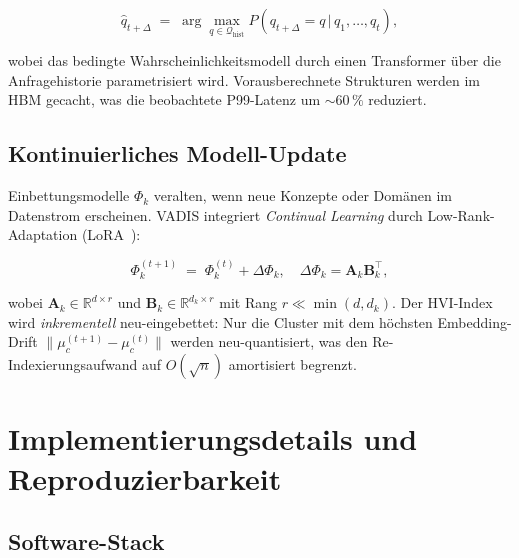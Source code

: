 ﻿\documentclass[12pt,a4paper]{article}
\begin{document}
\begin{equation}
  \hat{q}_{t+\Delta} \;=\; \arg\max_{q \in \mathcal{Q}_{\text{hist}}}
  P\!\left(q_{t+\Delta} = q \,|\, q_1, \ldots, q_t\right),
\end{equation}

wobei das bedingte Wahrscheinlichkeitsmodell durch einen
Transformer über die Anfragehistorie parametrisiert wird.
Vorausberechnete Strukturen werden im HBM gecacht, was die
beobachtete P99-Latenz um $\sim 60\,\%$ reduziert.

\subsection{Kontinuierliches Modell-Update}

Einbettungsmodelle $\Phi_k$ veralten, wenn neue Konzepte oder
Domänen im Datenstrom erscheinen. VADIS integriert
\emph{Continual Learning} durch Low-Rank-Adaptation
(LoRA~\cite{hu2021lora}):

\begin{equation}
  \Phi_k^{(t+1)} \;=\; \Phi_k^{(t)} + \Delta\Phi_k,
  \quad \Delta\Phi_k = \mathbf{A}_k \mathbf{B}_k^\top,
\end{equation}

wobei $\mathbf{A}_k \in \mathbb{R}^{d \times r}$ und
$\mathbf{B}_k \in \mathbb{R}^{d_k \times r}$ mit
Rang $r \ll \min(d, d_k)$. Der HVI-Index wird \emph{inkrementell}
neu-eingebettet: Nur die Cluster mit dem höchsten
Embedding-Drift $\|\mu_c^{(t+1)} - \mu_c^{(t)}\|$ werden
neu-quantisiert, was den Re-Indexierungsaufwand auf
$O(\sqrt{n})$ amortisiert begrenzt.

\section{Implementierungsdetails und Reproduzierbarkeit}
\label{sec:impl}

\subsection{Software-Stack}
\end{document}
